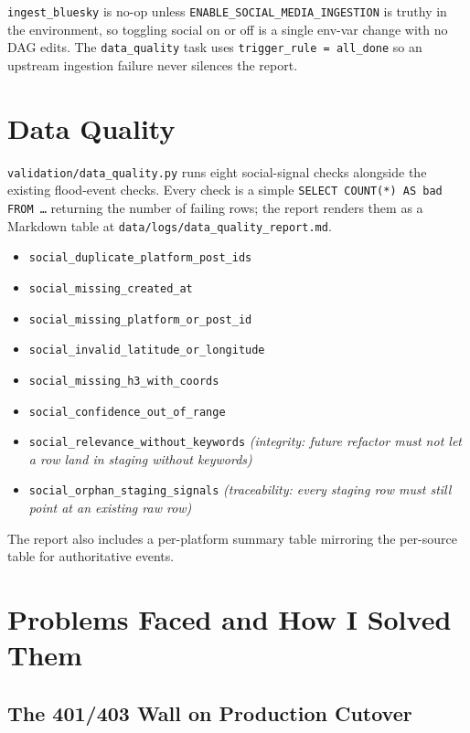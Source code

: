 \documentclass[11pt]{article}
\begin{document}
\texttt{ingest\_bluesky} is no-op unless
\texttt{ENABLE\_SOCIAL\_MEDIA\_INGESTION} is truthy in the environment,
so toggling social on or off is a single env-var change with no DAG
edits. The \texttt{data\_quality} task uses \texttt{trigger\_rule =
all\_done} so an upstream ingestion failure never silences the report.

\section{Data Quality}

\texttt{validation/data\_quality.py} runs eight social-signal checks
alongside the existing flood-event checks. Every check is a simple
\texttt{SELECT COUNT(*) AS bad FROM \ldots} returning the number of
failing rows; the report renders them as a Markdown table at
\texttt{data/logs/data\_quality\_report.md}.

\begin{itemize}[leftmargin=*]
  \item \texttt{social\_duplicate\_platform\_post\_ids}
  \item \texttt{social\_missing\_created\_at}
  \item \texttt{social\_missing\_platform\_or\_post\_id}
  \item \texttt{social\_invalid\_latitude\_or\_longitude}
  \item \texttt{social\_missing\_h3\_with\_coords}
  \item \texttt{social\_confidence\_out\_of\_range}
  \item \texttt{social\_relevance\_without\_keywords}
        \emph{(integrity: future refactor must not let a row land in
        staging without keywords)}
  \item \texttt{social\_orphan\_staging\_signals}
        \emph{(traceability: every staging row must still point at an
        existing raw row)}
\end{itemize}

The report also includes a per-platform summary table mirroring the
per-source table for authoritative events.

\section{Problems Faced and How I Solved Them}

\subsection{The 401/403 Wall on Production Cutover}
\end{document}
